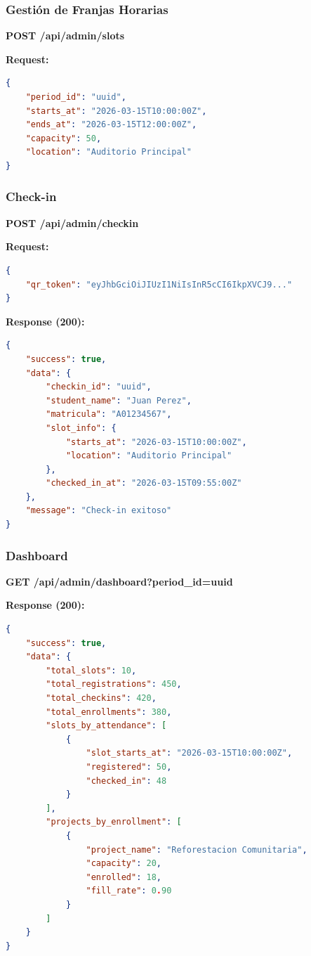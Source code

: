 \documentclass[12pt,a4paper]{article}
\begin{document}
\subsubsection{Gestión de Franjas Horarias}

\textbf{POST /api/admin/slots}

\textbf{Request:}
\begin{lstlisting}[language=json]
{
    "period_id": "uuid",
    "starts_at": "2026-03-15T10:00:00Z",
    "ends_at": "2026-03-15T12:00:00Z",
    "capacity": 50,
    "location": "Auditorio Principal"
}
\end{lstlisting}

\subsubsection{Check-in}

\textbf{POST /api/admin/checkin}

\textbf{Request:}
\begin{lstlisting}[language=json]
{
    "qr_token": "eyJhbGciOiJIUzI1NiIsInR5cCI6IkpXVCJ9..."
}
\end{lstlisting}

\textbf{Response (200):}
\begin{lstlisting}[language=json]
{
    "success": true,
    "data": {
        "checkin_id": "uuid",
        "student_name": "Juan Perez",
        "matricula": "A01234567",
        "slot_info": {
            "starts_at": "2026-03-15T10:00:00Z",
            "location": "Auditorio Principal"
        },
        "checked_in_at": "2026-03-15T09:55:00Z"
    },
    "message": "Check-in exitoso"
}
\end{lstlisting}

\subsubsection{Dashboard}

\textbf{GET /api/admin/dashboard?period\_id=uuid}

\textbf{Response (200):}
\begin{lstlisting}[language=json]
{
    "success": true,
    "data": {
        "total_slots": 10,
        "total_registrations": 450,
        "total_checkins": 420,
        "total_enrollments": 380,
        "slots_by_attendance": [
            {
                "slot_starts_at": "2026-03-15T10:00:00Z",
                "registered": 50,
                "checked_in": 48
            }
        ],
        "projects_by_enrollment": [
            {
                "project_name": "Reforestacion Comunitaria",
                "capacity": 20,
                "enrolled": 18,
                "fill_rate": 0.90
            }
        ]
    }
}
\end{lstlisting}
\end{document}
